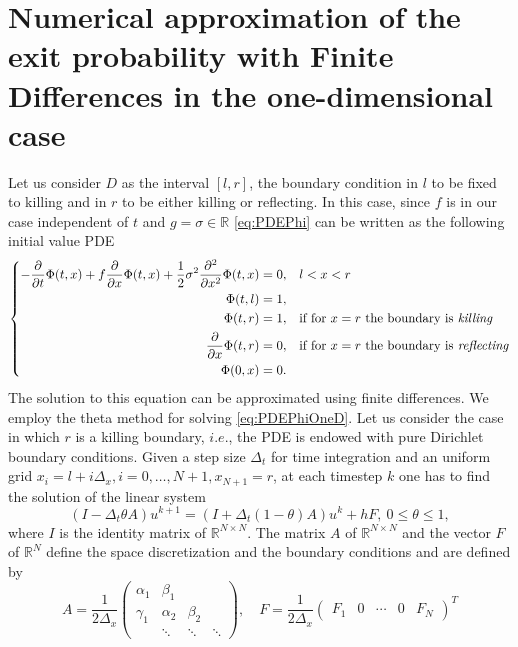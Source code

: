 \clearpage
\section{Numerical approximation of the exit probability with Finite Differences in the one-dimensional case}\label{sec:Appendix2}
\renewcommand{\thepage}{\thesection -\arabic{page}}
Let us consider $D$ as the interval $\left[ l,r \right]$, the boundary condition in $l$ to be fixed to killing and in $r$ to be either killing or reflecting. In this case, since $f$ is in our case independent of $t$ and $g = \sigma \in \mathbb{R}$ \eqref{eq:PDEPhi} can be written as the following initial value PDE 
\begin{equation}\label{eq:PDEPhiOneD}
\left \{
\begin{aligned}
	-\frac{\partial}{\partial t} \Phi(t,x) + f\frac{\partial}{\partial x} \Phi(t,x) + \frac{1}{2}\sigma^2 \frac{\partial^2}{\partial x^2} \Phi(t,x) &= 0, && l < x < r \\
	\Phi(t,l) &= 1, \\
	\Phi(t,r) &= 1, && \text{if for $x = r$ the boundary is \textit{killing}} \\
	\frac{\partial}{\partial x}\Phi(t,r) &= 0, && \text{if for $x = r$ the boundary is \textit{reflecting}} \\
	\Phi(0,x) &= 0.
\end{aligned} \right .
\end{equation}
The solution to this equation can be approximated using finite differences. We employ the theta method for solving \eqref{eq:PDEPhiOneD}. Let us consider the case in which $r$ is a killing boundary, $i.e.$, the PDE is endowed with pure Dirichlet boundary conditions. Given a step size $\Delta_t$ for time integration and an uniform grid $x_i = l + i\Delta_x, i=0,\dots,N+1, x_{N+1} = r$, at each timestep $k$ one has to find the solution of the linear system
\begin{equation}\label{eq:ThetaMethod}
	(I - \Delta_t\theta A) u^{k+1} = (I + \Delta_t(1-\theta) A)u^k + hF, \: 0 \leq \theta \leq 1,
\end{equation}
where $I$ is the identity matrix of $\mathbb{R}^{N\times N}$. The matrix $A$ of $\mathbb{R}^{N\times N}$ and the vector $F$ of $\mathbb{R}^N$ define the space discretization and the boundary conditions and are defined by
\begin{equation}\label{eq:ThetaMethodAandF}
	A = \frac{1}{2\Delta_x}\begin{pmatrix} 	\alpha_1 & \beta_1  &  	      &\\
						\gamma_1 & \alpha_2 & \beta_2 &\\
							 & \ddots   & \ddots  & \ddots \end{pmatrix}, \quad F = \frac{1}{2\Delta_x}\begin{pmatrix} F_1 & 0 & \cdots & 0 & F_N \end{pmatrix}^T
\end{equation}
